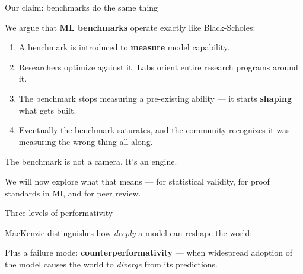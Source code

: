 \documentclass[aspectratio=169,11pt]{beamer}
\begin{document}
\begin{frame}[label=benchclaim]{Our claim: benchmarks do the same thing}

\vspace{0.3em}

We argue that \textbf{ML benchmarks} operate exactly like Black-Scholes:

\vspace{0.5em}

\begin{enumerate}\setlength\itemsep{8pt}
  \item {\small A benchmark is introduced to \textbf{measure} model capability.}
  \item {\small Researchers optimize against it. Labs orient entire research programs around it.}
  \item {\small The benchmark stops measuring a pre-existing ability --- it starts \textbf{shaping} what gets built.}
  \item {\small Eventually the benchmark saturates, and the community recognizes it was measuring the wrong thing all along.}
\end{enumerate}

\vspace{0.5em}

{\small The benchmark is not a camera. It's an engine.}

\vspace{0.3em}
{\small We will now explore what that means --- for statistical validity, for proof standards in MI, and for peer review.}
\end{frame}

\begin{frame}{Three levels of performativity}

MacKenzie distinguishes how \emph{deeply} a model can reshape the world:

\vspace{0.5em}


\vspace{0.5em}
Plus a failure mode: \textbf{\textcolor{counter}{counterperformativity}} --- when widespread adoption of the model causes the world to \emph{diverge} from its predictions.
\end{frame}
\end{document}
